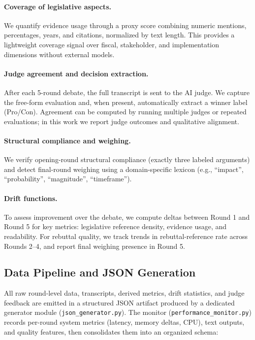 \documentclass{article}
\begin{document}
\paragraph{Coverage of legislative aspects.} We quantify evidence usage through a proxy score combining numeric mentions, percentages, years, and citations, normalized by text length. This provides a lightweight coverage signal over fiscal, stakeholder, and implementation dimensions without external models.

\paragraph{Judge agreement and decision extraction.} After each 5-round debate, the full transcript is sent to the AI judge. We capture the free-form evaluation and, when present, automatically extract a winner label (Pro/Con). Agreement can be computed by running multiple judges or repeated evaluations; in this work we report judge outcomes and qualitative alignment.

\paragraph{Structural compliance and weighing.} We verify opening-round structural compliance (exactly three labeled arguments) and detect final-round weighing using a domain-specific lexicon (e.g., ``impact'', ``probability'', ``magnitude'', ``timeframe'').

\paragraph{Drift functions.} To assess improvement over the debate, we compute deltas between Round 1 and Round 5 for key metrics: legislative reference density, evidence usage, and readability. For rebuttal quality, we track trends in rebuttal-reference rate across Rounds 2--4, and report final weighing presence in Round 5.

\subsection{Data Pipeline and JSON Generation}

All raw round-level data, transcripts, derived metrics, drift statistics, and judge feedback are emitted in a structured JSON artifact produced by a dedicated generator module (\texttt{json\_generator.py}). The monitor (\texttt{performance\_monitor.py}) records per-round system metrics (latency, memory deltas, CPU), text outputs, and quality features, then consolidates them into an organized schema:
\end{document}

